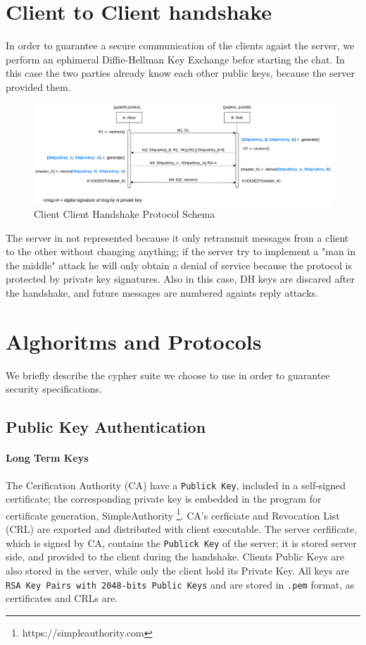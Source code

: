 \documentclass[11pt]{report}
\begin{document}
\section{Client to Client handshake}
In order to guarantee a secure communication of the clients agaist the server, we perform an ephimeral 
Diffie-Hellman Key Exchange befor starting the chat. In this case the two parties already know each other
public keys, because the server provided them. 
\begin{figure}[H]
	\centering
	\includegraphics[scale=0.19]{img/AuthClientClient.png}
	\caption{Client Client Handshake Protocol Schema}
	\label {img: AuthClientClient}
\end{figure}
The server in not represented because it only retransmit messages from a client to the other without changing
anything; if the server try to implement a "man in the middle" attack he will only obtain a denial of service
because the protocol is protected by private key signatures. Also in this case, DH keys are discared after 
the handshake, and future messages are numbered againts reply attacks.

\section{Alghoritms and Protocols}
We briefly describe the cypher suite we choose to use in order to guarantee security specifications.
\subsection{Public Key Authentication}
\paragraph*{Long Term Keys}
The Cerification Authority (CA) have a \texttt{Publick Key}, included in a self-signed
certificate; the corresponding private key is embedded in the program for certificate generation, 
SimpleAuthority \footnote{https://simpleauthority.com}.
CA's cerficiate and Revocation List (CRL) are exported and distributed with client executable.
The server cerfificate, which is signed by CA, contains the \texttt{Publick Key} of the server; it
is stored server side, and provided to the client during the handshake.
Clients Public Keys are also stored in the server, while only the client hold its Private Key.
All keys are \texttt{RSA Key Pairs with 2048-bits Public Keys} and are stored in \texttt{.pem} format, as certificates and CRLs are.
\end{document}
